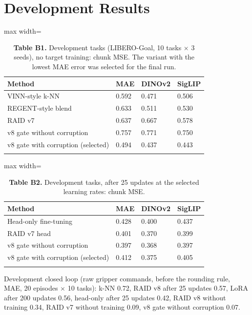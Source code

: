 \documentclass[10pt,twocolumn,letterpaper]{article}
\begin{document}
\section{Development Results}

\begin{table}[h!]\centering\small
\caption*{\textbf{\sffamily Table B1.} Development tasks (LIBERO-Goal, 10 tasks \ensuremath{\times} 3 seeds), no target training: chunk MSE. The variant with the lowest MAE error was selected for the final run.}
\begin{adjustbox}{max width=\linewidth}
\begin{tabular}{@{}llll@{}}
\toprule\noalign{}
Method & MAE & DINOv2 & SigLIP \\
\midrule\noalign{}
VINN-style k-NN & 0.592 & 0.471 & 0.506 \\
REGENT-style blend & 0.633 & 0.511 & 0.530 \\
RAID v7 & 0.637 & 0.667 & 0.578 \\
v8 gate without corruption & 0.757 & 0.771 & 0.750 \\
v8 gate with corruption (selected) & 0.494 & 0.437 & 0.443 \\
\bottomrule\noalign{}
\end{tabular}
\end{adjustbox}
\end{table}

\begin{table}[h!]\centering\small
\caption*{\textbf{\sffamily Table B2.} Development tasks, after 25 updates at the selected learning rates: chunk MSE.}
\begin{adjustbox}{max width=\linewidth}
\begin{tabular}{@{}llll@{}}
\toprule\noalign{}
Method & MAE & DINOv2 & SigLIP \\
\midrule\noalign{}
Head-only fine-tuning & 0.428 & 0.400 & 0.437 \\
RAID v7 head & 0.401 & 0.370 & 0.399 \\
v8 gate without corruption & 0.397 & 0.368 & 0.397 \\
v8 gate with corruption (selected) & 0.412 & 0.375 & 0.405 \\
\bottomrule\noalign{}
\end{tabular}
\end{adjustbox}
\end{table}

Development closed loop (raw gripper commands, before the rounding rule, MAE, 20 episodes \ensuremath{\times} 10 tasks): k-NN 0.72, RAID v8 after 25 updates 0.57, LoRA after 200 updates 0.56, head-only after 25 updates 0.42, RAID v8 without training 0.34, RAID v7 without training 0.09, v8 gate without corruption 0.07.
\end{document}
